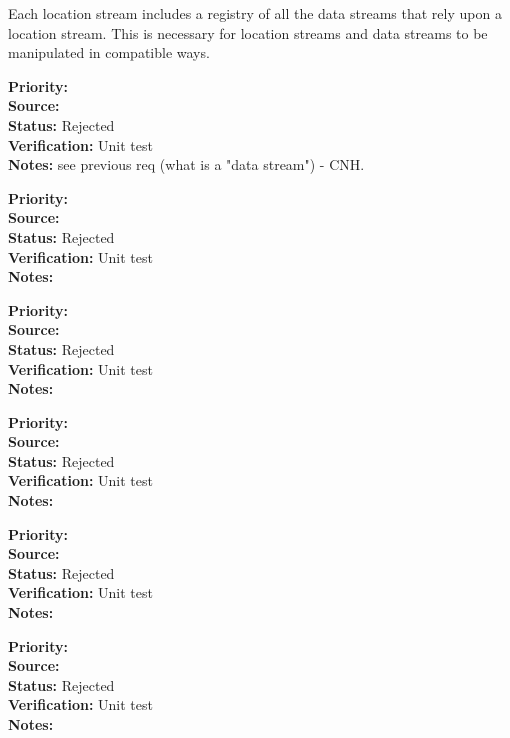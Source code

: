 Each location stream includes a registry of all the data streams that rely upon a
location stream.  This is necessary for location streams and data streams to be
manipulated in compatible ways.
\begin{reqlist}
{\bf Priority:}  \\
{\bf Source:} \\
{\bf Status:} Rejected \\
{\bf Verification:} Unit test \\
{\bf Notes:} see previous req (what is a "data stream") - CNH.
\end{reqlist}
\begin{reqlist}
{\bf Priority:}  \\
{\bf Source:} \\
{\bf Status:} Rejected \\
{\bf Verification:} Unit test \\
{\bf Notes:} 
\end{reqlist}
\begin{reqlist}
{\bf Priority:}  \\
{\bf Source:} \\
{\bf Status:} Rejected \\
{\bf Verification:} Unit test \\
{\bf Notes:} 
\end{reqlist}
\begin{reqlist}
{\bf Priority:}  \\
{\bf Source:} \\
{\bf Status:} Rejected \\
{\bf Verification:} Unit test \\
{\bf Notes:} 
\end{reqlist}
\begin{reqlist}
{\bf Priority:}  \\
{\bf Source:} \\
{\bf Status:} Rejected \\
{\bf Verification:} Unit test \\
{\bf Notes:} 
\end{reqlist}
\begin{reqlist}
{\bf Priority:}  \\
{\bf Source:} \\
{\bf Status:} Rejected \\
{\bf Verification:} Unit test \\
{\bf Notes:} 
\end{reqlist}

